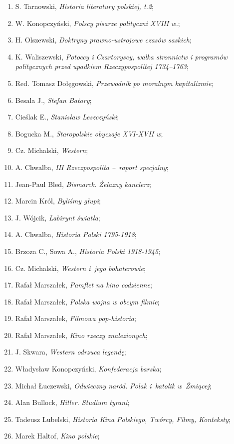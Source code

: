 \documentclass[a4paper,11pt]{article}
\begin{document}
\begin{enumerate}
\item S. Tarnowski, \emph{Historia literatury polskiej, t.2};
\item W. Konopczyński, \emph{Polscy pisarze polityczni XVIII w.};
\item H. Olszewski, \emph{Doktryny prawno-ustrojowe czasów saskich};
\item K. Waliszewski, \emph{Potoccy i Czartoryscy, walka stronnictw i
    programów politycznych przed upadkiem Rzeczypospolitej
    1734--1763};
\item Red. Tomasz Dołęgowski, \emph{Przewodnik po moralnym
    kapitalizmie};
\item Besala J., \emph{Stefan Batory};
\item Cieślak E., \emph{Stanisław Leszczyński};
\item Bogucka M., \emph{Staropolskie obyczaje XVI-XVII w};
\item Cz. Michalski, \emph{Western};
\item A. Chwalba, \emph{III Rzeczpospolita --~raport specjalny};
\item Jean-Paul Bled, \emph{Bismarck. Żelazny kanclerz};
\item Marcin Król, \emph{Byliśmy głupi};
\item J. Wójcik, \emph{Labirynt światła};
\item A. Chwalba, \emph{Historia Polski 1795-1918};
\item Brzoza C., Sowa A., \emph{Historia Polski 1918-1945};
\item Cz. Michalski, \emph{Western i~jego bohaterowie};
\item Rafał Marszałek, \emph{Pamflet na kino codzienne};
\item Rafał Marszałek, \emph{Polska wojna w obcym filmie};
\item Rafał Marszałek, \emph{Filmowa pop-historia};
\item Rafał Marszałek, \emph{Kino rzeczy znalezionych};
\item J. Skwara, \emph{Western odrzuca legendę};
\item Władysław Konopczyński, \emph{Konfederacja barska};
\item Michał Łuczewski, \emph{Odwieczny naród. Polak i~katolik
    w~Żmiącej};
\item Alan Bullock, \emph{Hitler. Studium tyrani};
\item Tadeusz Lubelski, \emph{Historia Kina Polskiego, Twórcy, Filmy,
    Konteksty};
\item Marek Haltof, \emph{Kino polskie};

\end{enumerate}
\end{document}
